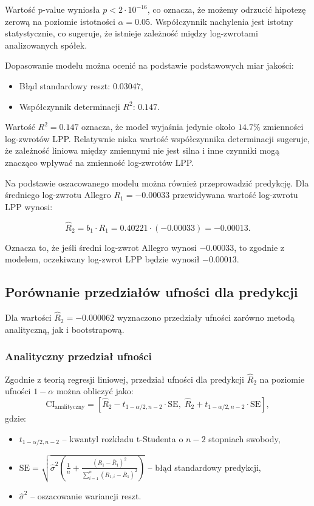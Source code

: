 \documentclass[12pt]{article}
\begin{document}
Wartość p-value wyniosła \( p < 2 \cdot 10^{-16} \), co oznacza, że możemy odrzucić hipotezę zerową na poziomie istotności \( \alpha = 0.05 \). Współczynnik nachylenia jest istotny statystycznie, co sugeruje, że istnieje zależność między log-zwrotami analizowanych spółek.

Dopasowanie modelu można ocenić na podstawie podstawowych miar jakości:

\begin{itemize}
    \item Błąd standardowy reszt: \( 0.03047 \),
    \item Współczynnik determinacji \( R^2 \): \( 0.147 \).
\end{itemize}

Wartość \( R^2 = 0.147 \) oznacza, że model wyjaśnia jedynie około \( 14.7\% \) zmienności log-zwrotów LPP. Relatywnie niska wartość współczynnika determinacji sugeruje, że zależność liniowa między zmiennymi nie jest silna i inne czynniki mogą znacząco wpływać na zmienność log-zwrotów LPP.

Na podstawie oszacowanego modelu można również przeprowadzić predykcję. Dla średniego log-zwrotu Allegro \( R_1 = -0.00033 \) przewidywana wartość log-zwrotu LPP wynosi:

\[
\hat{R}_2 = b_1 \cdot R_1 = 0.40221 \cdot (-0.00033) = -0.00013.
\]

Oznacza to, że jeśli średni log-zwrot Allegro wynosi \( -0.00033 \), to zgodnie z modelem, oczekiwany log-zwrot LPP będzie wynosił \( -0.00013 \). 

\subsection{Porównanie przedziałów ufności dla predykcji}
Dla wartości \( \hat{R}_2 = -0.000062 \) wyznaczono przedziały ufności zarówno metodą analityczną, jak i bootstrapową.

\subsubsection{Analityczny przedział ufności}
Zgodnie z teorią regresji liniowej, przedział ufności dla predykcji \( \hat{R}_2 \) na poziomie ufności \(1-\alpha\) można obliczyć jako:
\[
\text{CI}_{\text{analityczny}} = \left[ \hat{R}_2 - t_{1-\alpha/2, n-2} \cdot \text{SE}, \; \hat{R}_2 + t_{1-\alpha/2, n-2} \cdot \text{SE} \right],
\]
gdzie:
\begin{itemize}
    \item \(t_{1-\alpha/2, n-2}\) – kwantyl rozkładu t-Studenta o \(n-2\) stopniach swobody,
    \item \(\text{SE} = \sqrt{\hat{\sigma}^2 \left( \frac{1}{n} + \frac{(R_1 - \overline{R}_1)^2}{\sum_{i=1}^n (R_{1,i} - \overline{R}_1)^2} \right)}\) – błąd standardowy predykcji,
    \item \(\hat{\sigma}^2\) – oszacowanie wariancji reszt.
\end{itemize}
\end{document}
